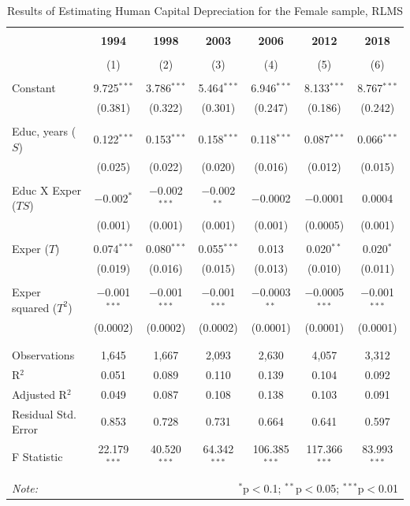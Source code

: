 \documentclass[12pt,a4paper]{article}
\numberwithin{equation}{section}
\begin{document}
\begin{table}[!htbp] \centering 
\caption{Results of Estimating Human Capital Depreciation for the Female sample, RLMS} 
	\label{tab:A1}
\begin{tabular}{@{\extracolsep{5pt}}lcccccc} 
\\[-1.8ex]\hline 
\hline \\[-1.8ex] 
& \textbf{1994} & \textbf{1998} & \textbf{2003} & \textbf{2006} & \textbf{2012} & \textbf{2018} \\ 
\\[-1.8ex] & (1) & (2) & (3) & (4) & (5) & (6)\\ 
\hline \\[-1.8ex] 
 Constant & 9.725$^{***}$ & 3.786$^{***}$ & 5.464$^{***}$ & 6.946$^{***}$ & 8.133$^{***}$ & 8.767$^{***}$ \\ 
  & (0.381) & (0.322) & (0.301) & (0.247) & (0.186) & (0.242) \\ 
  & & & & & & \\ 
 Educ, years ($S$) & 0.122$^{***}$ & 0.153$^{***}$ & 0.158$^{***}$ & 0.118$^{***}$ & 0.087$^{***}$ & 0.066$^{***}$ \\ 
  & (0.025) & (0.022) & (0.020) & (0.016) & (0.012) & (0.015) \\ 
  & & & & & & \\ 
 Educ X Exper ($TS$) & $-$0.002$^{*}$ & $-$0.002$^{***}$ & $-$0.002$^{**}$ & $-$0.0002 & $-$0.0001 & 0.0004 \\ 
  & (0.001) & (0.001) & (0.001) & (0.001) & (0.0005) & (0.001) \\ 
  & & & & & & \\ 
 Exper ($T$) & 0.074$^{***}$ & 0.080$^{***}$ & 0.055$^{***}$ & 0.013 & 0.020$^{**}$ & 0.020$^{*}$ \\ 
  & (0.019) & (0.016) & (0.015) & (0.013) & (0.010) & (0.011) \\ 
  & & & & & & \\ 
 Exper squared ($T^2$) & $-$0.001$^{***}$ & $-$0.001$^{***}$ & $-$0.001$^{***}$ & $-$0.0003$^{**}$ & $-$0.0005$^{***}$ & $-$0.001$^{***}$ \\ 
  & (0.0002) & (0.0002) & (0.0002) & (0.0001) & (0.0001) & (0.0001) \\ 
  & & & & & & \\ 
\hline \\[-1.8ex] 
Observations & 1,645 & 1,667 & 2,093 & 2,630 & 4,057 & 3,312 \\ 
R$^{2}$ & 0.051 & 0.089 & 0.110 & 0.139 & 0.104 & 0.092 \\ 
Adjusted R$^{2}$ & 0.049 & 0.087 & 0.108 & 0.138 & 0.103 & 0.091 \\ 
Residual Std. Error & 0.853 & 0.728 & 0.731 & 0.664 & 0.641 & 0.597 \\ 
F Statistic & 22.179$^{***}$ & 40.520$^{***}$ & 64.342$^{***}$ & 106.385$^{***}$ & 117.366$^{***}$ & 83.993$^{***}$ \\ 
\hline 
\hline \\[-1.8ex] 
\textit{Note:}  & \multicolumn{6}{r}{$^{*}$p$<$0.1; $^{**}$p$<$0.05; $^{***}$p$<$0.01} \\ 
\end{tabular} 
\end{table} 
\end{document}
